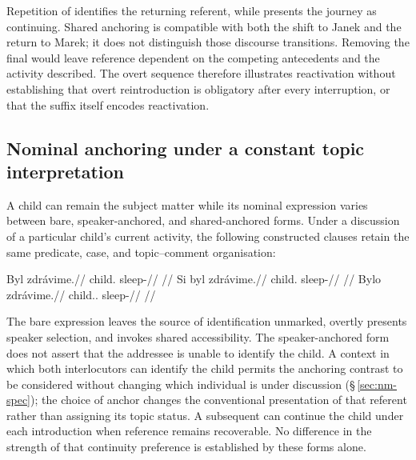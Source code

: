 \noindent Repetition of  identifies the returning referent, while
  presents the journey as continuing. Shared anchoring is compatible
 with both the shift to Janek and the return to Marek; it does not distinguish
 those discourse transitions. Removing the final  would leave
 reference dependent on the competing antecedents and the activity described.
 The overt sequence therefore illustrates reactivation without establishing
 that overt reintroduction is obligatory after every interruption, or that
 the suffix itself encodes reactivation.

\subsection{Nominal anchoring under a constant topic interpretation}
\label{sec:disc-anchoring-controlled}

A child can remain the subject matter while its nominal expression varies
 between bare, speaker-anchored, and shared-anchored forms. Under a discussion
 of a particular child's current activity, the following constructed clauses
 retain the same predicate, case, and topic--comment organisation:

\pex\label{ex:disc-anchoring-controlled}
\a
\begingl
\gla Byl zdrávime.//
\glb child.\Dir{} sleep-\Prog{}//
\glft {} //
\endgl
\a
\begingl
\gla Si byl zdrávime.//
\glb \Sanch{} child.\Dir{} sleep-\Prog{}//
\glft {} //
\endgl
\a
\begingl
\gla Bylo zdrávime.//
\glb child.\Dir{}.\Def{} sleep-\Prog{}//
\glft {} //
\endgl
\xe

\noindent The bare expression leaves the source of identification unmarked,
  overtly presents speaker selection, and  invokes
 shared accessibility. The speaker-anchored form does not assert that the
 addressee is unable to identify the child. A context in which both
 interlocutors can identify the child permits the anchoring contrast to be
 considered without changing which individual is under discussion
 (§\,\ref{sec:nm-spec}); the choice of anchor changes the conventional
 presentation of that referent rather than assigning its topic status.
 A subsequent  can continue the child under each introduction
 when reference remains recoverable. No difference in the strength of that
 continuity preference is established by these forms alone.


